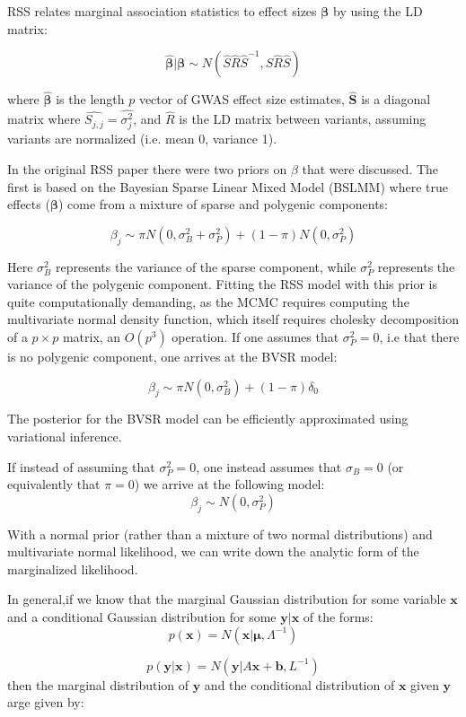 RSS relates marginal association statistics to effect sizes $\boldsymbol{\beta}$ by using the LD matrix:

$$ \hat{\boldsymbol{\beta}} | \boldsymbol{\beta} \sim N(\hat{S}\hat{R}\hat{S}^{-1},\hat{S}\hat{R}\hat{S}) $$

where \(\hat{\boldsymbol{\beta}}\) is the length $p$ vector of GWAS effect size estimates,  $\hat{\textbf{S}}$ is a diagonal matrix where $\hat{S_{j,j}}=\hat{\sigma_j^2}$, and $\hat{R}$ is the LD matrix between variants, assuming variants are normalized (i.e. mean 0, variance 1). 

In the original RSS paper there were two priors on \(\beta\) that were discussed.  The first is based on the Bayesian Sparse Linear Mixed Model (BSLMM)\cite{bslmm} where true effects ($\boldsymbol{\beta}$)
come from a mixture of sparse and polygenic components:

$$ \beta_j \sim \pi N(0,\sigma^2_B+\sigma^2_P)+(1-\pi) N(0,\sigma^2_P) $$

Here \(\sigma^2_B\) represents the variance of the sparse component, while \(\sigma^2_P\) represents the variance of the polygenic component. Fitting the RSS model with this prior is quite computationally demanding, 
as the MCMC requires computing the multivariate normal density function, which itself requires cholesky decomposition of a \(p \times p\) matrix, an \(O(p^3)\) operation.  If one assumes that \(\sigma^2_P=0\),
i.e that there is no polygenic component, one arrives at the BVSR model:

$$ \beta_j \sim \pi N(0,\sigma^2_B)+(1-\pi) \delta_0 $$

The posterior for the BVSR model can be efficiently approximated using variational inference. 

If instead of assuming that \(\sigma^2_P=0\), one instead assumes that \(\sigma_B=0\) (or equivalently that \(\pi=0\)) we arrive at the following model: 
$$ \beta_j \sim N(0,\sigma^2_P)$$

With a normal prior (rather than a mixture of two normal distributions) and multivariate normal likelihood, we can write down the analytic form of the marginalized likelihood\cite{patternrecognition}.

In general,if we know that the marginal Gaussian distribution for some variable \(\textbf{x}\) and a conditional Gaussian distribution for some \(\textbf{y}|\textbf{x}\) of the forms:
$$p(\textbf{x}) = N(\textbf{x}|\boldsymbol{\mu},\Lambda^{-1})$$

$$p(\textbf{y}|\textbf{x}) = N(\textbf{y}|A\textbf{x}+\textbf{b},L^{-1})$$
then the marginal distribution of \(\textbf{y}\) and the conditional distribution of \(\textbf{x}\) given \(\textbf{y}\) arge given by: 

